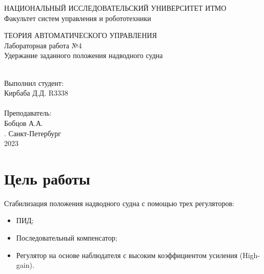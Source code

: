 \documentclass[12pt]{article}
\begin{document}
\begin{titlepage}
\begin{center}
    {\small НАЦИОНАЛЬНЫЙ ИССЛЕДОВАТЕЛЬСКИЙ УНИВЕРСИТЕТ ИТМО} \\
    {\small Факультет систем управления и робототехники} \\
    \vspace*{10\baselineskip}

    \begin{spacing}{1.2}
    {\LARGE ТЕОРИЯ АВТОМАТИЧЕСКОГО УПРАВЛЕНИЯ \\
    Лабораторная работа №4 \\
    Удержание заданного положения надводного судна\\}
    \end{spacing}
    \ \\
    \vspace*{10\baselineskip}
    \hfill {\small Выполнил студент:} \\
    \hfill {\small Кирбаба Д.Д. R3338} \\
    \ \\
    \hfill {\small Преподаватель:} \\
    \hfill {\small Бобцов А.А.} \\
    \mbox{}
    \vfill {. Санкт-Петербург\\2023}
\end{center}
\end{titlepage}

\section*{Цель работы}
Стабилизация положения надводного судна с помощью трех регуляторов:
\begin{itemize}
  \item ПИД;
  \item Последовательный компенсатор;
  \item Регулятор на основе наблюдателя с высоким коэффициентом усиления (High-gain).
\end{itemize}
\end{document}
